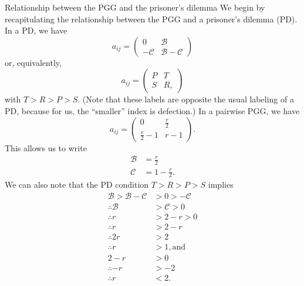 \documentclass[13pt]{amsart}
\newcommand{\B}{\mathcal{B}}
\newcommand{\C}{\mathcal{C}}
\begin{document}
\begin{section}{Relationship between the PGG and the prisoner's dilemma}
We begin by recapitulating the relationship between the PGG and a prisoner's dilemma (PD).
In a PD, we have
\begin{equation}
    a_{ij} =
    \begin{pmatrix}
        0 & \B \\
        -\C & \B - \C
    \end{pmatrix}
\end{equation}
or, equivalently,
\begin{equation}
    a_{ij} =
    \begin{pmatrix}
        P & T \\
        S & R,
    \end{pmatrix}
\end{equation}
with $T > R > P > S$.
(Note that these labels are opposite the usual labeling of a PD, because for us, the ``smaller'' index is defection.)
In a pairwise PGG, we have
\begin{equation}
    a_{ij} =
    \begin{pmatrix}
        0 & \frac{r}{2} \\
        \frac{r}{2} - 1 & r - 1
    \end{pmatrix}.
\end{equation}
This allows us to write
\begin{equation}
    \begin{split}
        \mathcal{B} & = \frac{r}{2}\\
        \mathcal{C} & = 1 - \frac{r}{2}.
    \end{split}
\end{equation}
We can also note that the PD condition $T > R > P > S$ implies
\begin{equation}
    \begin{split}
        \mathcal{B} > \mathcal{B} - \mathcal{C} & > 0 > -\mathcal{C} \\
        \therefore \mathcal{B} & > \mathcal{C} > 0 \\
        \therefore r & > 2 - r > 0 \\
        \therefore r & > 2 - r \\
        \therefore 2r & > 2 \\
        \therefore r & > 1, \text{and}\\
        2 - r & > 0\\
        \therefore -r & > -2\\
        \therefore r & < 2.

\end{split}
\end{equation}
\end{section}
\end{document}
